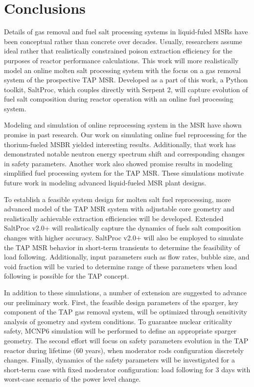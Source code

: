 \section{Conclusions}
Details of gas removal and fuel salt processing systems in liquid-fuled 
\glspl{MSR} have been conceptual rather than concrete over 
decades. Usually, researchers assume ideal rather that realistically 
constrained poison extraction efficiency for the purposes of reactor 
performance calculations. This work will more realistically model an online 
molten salt processing system with the focus on a gas removal system of the 
prospective \gls{TAP} \gls{MSR}. Developed as a part of this work, a Python 
toolkit, SaltProc, which couples directly with Serpent 2, will capture 
evolution of fuel salt composition during reactor operation with an online 
fuel processing system.

Modeling and simulation of online reprocessing system in the \gls{MSR} have 
shown promise in past research. Our work on simulating online fuel 
reprocessing for the thorium-fueled \gls{MSBR} yielded interesting results. 
Additionally, that work has demonstrated notable neutron energy spectrum shift 
and corresponding changes in safety parameters. 
Another work also showed promise results in modeling simplified fuel 
processing system for the \gls{TAP} \gls{MSR}. These simulations motivate 
future work in modeling advanced liquid-fueled \gls{MSR} plant designs.

To establish a feasible system design for molten salt fuel reprocessing, more 
advanced model of the \gls{TAP} \gls{MSR} system with adjustable core geometry 
and realistically achievable extraction efficiencies will be developed. 
Extended SaltProc v2.0+ will realistically capture the dynamics of fuels salt 
composition changes with higher accuracy. SaltProc v2.0+ will also be employed 
to simulate the \gls{TAP} \gls{MSR} behavior in short-term transients to 
determine the feasibility of load following. Additionally, input parameters 
such as flow rates, bubble size, and void fraction will be varied to determine 
range of these parameters when load following is possible for the \gls{TAP} 
concept.

In addition to these simulations, a number of extension are suggested to 
advance our preliminary work. First, the feasible design parameters of the 
sparger, key component of the \gls{TAP} gas removal system, will be optimized 
through sensitivity analysis of geometry and system conditions. To guarantee 
nuclear criticality safety, MCNP6 simulation will be performed to define an 
appropriate sparger geometry. The second effort will focus on safety 
parameters evolution in the \gls{TAP} reactor during lifetime (60 years),  
when moderator rods configuration discretely changes. Finally, dynamics of the 
safety parameters will be investigated for a short-term case with fixed 
moderator configuration: load following for 3 days with worst-case scenario of 
the power level change. 

